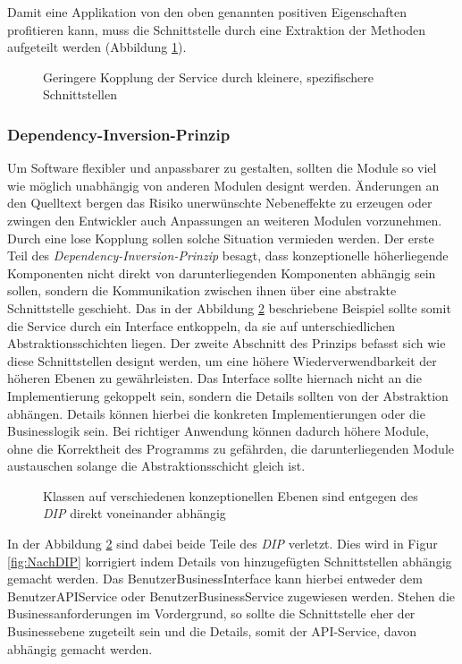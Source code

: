 \documentclass[conference]{IEEEtran}
\begin{document}
Damit eine Applikation von den oben genannten positiven Eigenschaften profitieren kann, muss die Schnittstelle durch eine Extraktion der Methoden aufgeteilt werden (Abbildung \ref{fig:NachISP}).

\begin{figure}[htbp]
	\small
	
	\caption{Geringere Kopplung der Service durch kleinere, spezifischere Schnittstellen} 
	\label{fig:NachISP}
\end{figure}



\subsubsection{Dependency-Inversion-Prinzip} Um Software flexibler und anpassbarer zu gestalten, sollten die Module so viel wie möglich unabhängig von anderen Modulen designt werden. Änderungen an den Quelltext bergen das Risiko unerwünschte Nebeneffekte zu erzeugen oder zwingen den Entwickler auch Anpassungen an weiteren Modulen vorzunehmen. Durch eine lose Kopplung sollen solche Situation vermieden werden. Der erste Teil des \emph{Dependency-Inversion-Prinzip} besagt, dass konzeptionelle höherliegende Komponenten nicht direkt von darunterliegenden Komponenten abhängig sein sollen, sondern die Kommunikation zwischen ihnen über eine abstrakte Schnittstelle geschieht. Das in der Abbildung \ref{fig:VorDIP} beschriebene Beispiel sollte somit die Service durch ein Interface entkoppeln, da sie auf unterschiedlichen Abstraktionsschichten liegen. Der zweite Abschnitt des Prinzips befasst sich wie diese Schnittstellen designt werden, um eine höhere Wiederverwendbarkeit der höheren Ebenen zu gewährleisten. Das Interface sollte hiernach nicht an die Implementierung gekoppelt sein, sondern die Details sollten von der Abstraktion abhängen. Details können hierbei die konkreten Implementierungen oder die Businesslogik sein. Bei richtiger Anwendung können dadurch höhere Module, ohne die Korrektheit des Programms zu gefährden, die darunterliegenden Module austauschen solange die Abstraktionsschicht gleich ist.

\begin{figure}[htbp]
	\small
	
	\caption{Klassen auf verschiedenen konzeptionellen Ebenen sind entgegen des \emph{DIP} direkt voneinander abhängig}
	\label{fig:VorDIP}
\end{figure}

In der Abbildung \ref{fig:VorDIP} sind dabei beide Teile des \emph{DIP} verletzt. Dies wird in Figur \ref{fig:NachDIP} korrigiert indem Details von hinzugefügten Schnittstellen abhängig gemacht werden. Das BenutzerBusinessInterface kann hierbei entweder dem BenutzerAPIService oder BenutzerBusinessService zugewiesen werden. Stehen die Businessanforderungen im Vordergrund, so sollte die Schnittstelle eher der Businessebene zugeteilt sein und die Details, somit der API-Service, davon abhängig gemacht werden.
\end{document}
